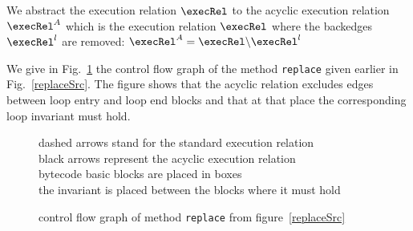 We abstract the execution relation $\execRel$ to the acyclic execution relation $\execRel^A$ which is the execution relation $\execRel$ where the backedges $ \execRel^l$ are removed: $\execRel^A = \execRel \backslash \execRel^l$



We give in Fig.~\ref{blockBC} the control flow graph of the method \texttt{replace} given earlier in Fig.~\ref{replaceSrc}. The figure shows that the acyclic relation
excludes edges between loop entry and loop end blocks and that at that place the corresponding loop invariant must hold.  

\begin{figure}
\begin{center}
\end{center}
dashed arrows stand for the standard execution relation \\ 
black arrows represent the acyclic execution relation \\
bytecode basic blocks are placed in boxes \\
the invariant is placed between the blocks where it must hold
\caption{control flow graph of method \texttt{replace} from figure~\ref{replaceSrc} }
\label{blockBC}
\end{figure}


